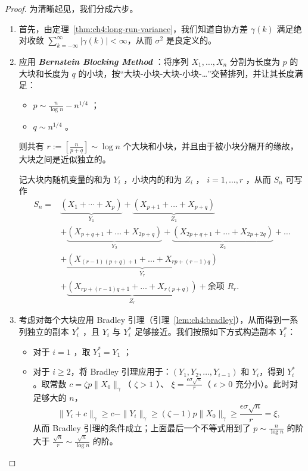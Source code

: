 \begin{proof}

为清晰起见，我们分成六步。
\begin{enumerate}[label=\textbf{第\chinese*步}:, leftmargin=4em]
 

\item 首先，由定理~\ref{thm:ch4:long-run-variance}，我们知道自协方差 $\gamma(k)$ 满足绝对收敛 $\sum_{k=-\infty}^\infty |\gamma(k)| < \infty$，从而 $\sigma^2$ 是良定义的。

\item 应用 \textbf{\emph{Bernstein Blocking Method }}：将序列 $X_1,\dots,X_n$ 分割为长度为 $p$ 的大块和长度为 $q$ 的小块，按``大块-小块-大块-小块-\ldots{}''交替排列，并让其长度满足：

\begin{itemize}
\tightlist
\item
  $p\sim\frac n{\log n}-n^{1/4}$ ；
\item
  $q\sim n^{1/4}$ 。
\end{itemize}

则共有 $r:=\left[\frac n{p+q}\right]\sim \log n$ 个大块和小块，并且由于被小块分隔开的缘故，大块之间是近似独立的。

记大块内随机变量的和为 $Y_i$ ，小块内的和为 $Z_i$ ， $i=1,\dots,r$ ，从而 $S_n$ 可写作
\[
\begin{aligned}
S_n={}&\underbrace{(X_1+ \cdots+ X_p)}_{Y_1} + \underbrace{(X_{p+1}+ \dots +X_{p+q})}_{Z_1}\\
&+ \underbrace{(X_{p+q+1} +\dots +X_{2p+q})}_{Y_2}+ \underbrace{(X_{2p+q+1}+ \dots +X_{2p+2q})}_{Z_2}+\dots\\
&+ \underbrace{(X_{(r-1)(p+q)+1} +\dots +X_{rp+(r-1)q})}_{Y_r}\\
&+\underbrace{(X_{rp+(r-1)q+1}+ \dots +X_{r(p+q)})}_{Z_r} + \text{余项 } R_r.
\end{aligned}
\]
\item 考虑对每个大块应用 Bradley 引理（引理~\ref{lem:ch4:bradley}），从而得到一系列独立的副本 $Y^*_i$ ，且 $Y_i$ 与 $Y^*_i$ 足够接近。我们按照如下方式构造副本 $Y_i^*$：

\begin{itemize}
\tightlist
\item
  对于 $i = 1$ ，取 $Y_1^*=Y_1$ ；
\item
  对于 $i \ge 2$，将 Bradley 引理应用于：$(Y_1,Y_2,\dots,Y_{i-1})$ 和 $Y_i$，得到 $Y_i^*$ 。取常数 $c = \zeta p \|X_0\|_\gamma$（ $\zeta > 1$ ）、 $\xi = \frac{\epsilon \sigma \sqrt{n}}{r}$（ $\epsilon > 0$ 充分小）。此时对足够大的 $n$，
  \[
  \|Y_i+c\|_\gamma
  \ge c-\|Y_i\|_\gamma
  \ge (\zeta-1)p\|X_0\|_\gamma
  \ge \frac{\epsilon\sigma\sqrt n}{r}
  =\xi,
  \]
  从而 Bradley 引理的条件成立；上面最后一个不等式用到了 $p\sim\frac n{\log n}$ 的阶大于 $\frac{\sqrt n}r\sim\frac{\sqrt n}{\log n}$ 的阶。
\end{itemize}


\end{enumerate}
\end{proof}
